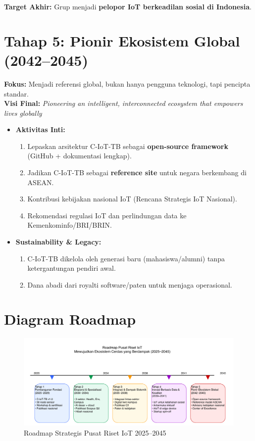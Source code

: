 \documentclass[11pt,a4paper]{article}
\begin{document}
\textbf{Target Akhir:} Grup menjadi \textbf{pelopor IoT berkeadilan sosial di Indonesia}.

\section{Tahap 5: Pionir Ekosistem Global (2042–2045)}
\label{sec:tahap5}

\textbf{Fokus:} Menjadi referensi global, bukan hanya pengguna teknologi, tapi pencipta standar.\\
\textbf{Visi Final:} \textit{Pioneering an intelligent, interconnected ecosystem that empowers lives globally}

\begin{itemize}

    \item \textbf{Aktivitas Inti:}
          \begin{enumerate}
              \item Lepaskan arsitektur C-IoT-TB sebagai \textbf{open-source framework} (GitHub + dokumentasi lengkap).
              \item Jadikan C-IoT-TB sebagai \textbf{reference site} untuk negara berkembang di ASEAN.
              \item Kontribusi kebijakan nasional IoT (Rencana Strategis IoT Nasional).
              \item Rekomendasi regulasi IoT dan perlindungan data ke Kemenkominfo/BRI/BRIN.
          \end{enumerate}

    \item \textbf{Sustainability \& Legacy:}
          \begin{enumerate}
              \item C-IoT-TB dikelola oleh generasi baru (mahasiswa/alumni) tanpa ketergantungan pendiri awal.
              \item Dana abadi dari royalti software/paten untuk menjaga operasional.
          \end{enumerate}
\end{itemize}

\section{Diagram Roadmap}
\begin{figure}[htbp]
    \centering
    \includegraphics[width=\textwidth]{roadmapdiagram.pdf}
    \caption{Roadmap Strategis Pusat Riset IoT 2025–2045}
    \label{fig:roadmap}
\end{figure}
\end{document}
